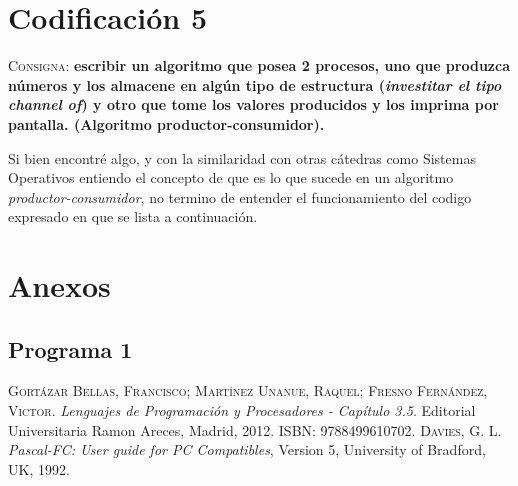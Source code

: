 \documentclass{article}
\begin{document}
\section{Codificaci\'on 5}
\textsc{Consigna}: \textbf{escribir un algoritmo que posea 2 procesos, uno que produzca n\'umeros y los almacene en alg\'un tipo de estructura (\textit{investitar el tipo channel of}) y otro que tome los valores producidos y los imprima por pantalla. (Algoritmo productor-consumidor).}

Si bien encontr\'e algo, y con la similaridad con otras c\'atedras como Sistemas Operativos entiendo el concepto de que es lo que sucede en un algoritmo \textit{productor-consumidor}, no termino de entender el funcionamiento del codigo expresado en \cite{davies1992} que se lista a continuaci\'on.





\newpage
\section{Anexos}

\subsection{Programa 1}
\label{sub:a11}


\newpage
\begin{thebibliography}{99}
	\textsc{Gort\'azar Bellas, Francisco; Mart\'inez Unanue, Raquel; Fresno Fern\'andez, Victor}. \textit{Lenguajes de Programaci\'on y Procesadores - Cap\'itulo 3.5}. Editorial Universitaria Ramon Areces, Madrid, 2012. \textsc{ISBN: 9788499610702}.
	\textsc{Davies, G. L}. \textit{Pascal-FC: User guide for PC Compatibles}, Version 5, University of Bradford, UK, 1992.
\end{thebibliography}
\end{document}
